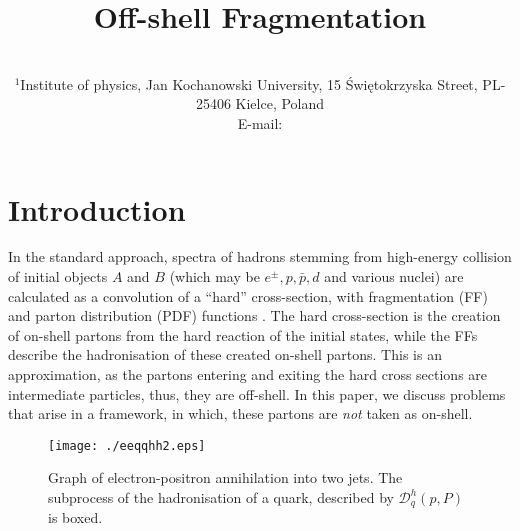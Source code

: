 \documentclass{PoS}
\title{Off-shell Fragmentation}
\author{\speaker{K. Urmossy}\\%
$^{1}$Institute of physics, Jan Kochanowski University, 15 \'{S}wi\k{e}tokrzyska Street,
PL-25406 Kielce, Poland\\
E-mail: \email{karoly.uermoessy@cern.ch}}
\begin{document}
\section{Introduction}
In the standard approach, spectra of hadrons stemming from high-energy collision of initial objects $A$ and $B$ (which may be $e^{\pm},p,\bar p, d$ and various nuclei) are calculated as a convolution of a ``hard'' cross-section, with fragmentation (FF) and parton distribution (PDF) functions \cite{bib:Resum}. The hard cross-section is the creation of on-shell partons from the hard reaction of the initial states, while the FFs describe the hadronisation of these created on-shell partons. This is an approximation, as the partons entering and exiting the hard cross sections are intermediate particles, thus, they are off-shell. In this paper, we discuss problems that arise in a framework, in which, these partons are \textit{not} taken as on-shell. %
\begin{figure}[!h]
\begin{center}
\texttt{[image: ./eeqqhh2.eps]} %
\end{center}
\caption{Graph of electron-positron annihilation into two jets. The subprocess of the hadronisation of a quark, described by $\mathcal{D}^h_q(p,P)$ is boxed.
\label{fig:eeqqhh2}}
\end{figure}
\end{document}
